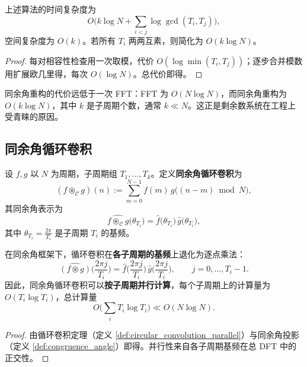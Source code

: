 \begin{theorem}[复杂度]\label{thm:congruence_angle_complexity}
上述算法的时间复杂度为
\[
O\!\Big(k\log N+\sum_{i<j}\log\gcd(T_i,T_j)\Big),
\]
空间复杂度为 $O(k)$。若所有 $T_i$ 两两互素，则简化为 $O(k\log N)$。
\end{theorem}

\begin{proof}
每对相容性检查用一次取模，代价 $O(\log\min(T_i,T_j))$；逐步合并模数用扩展欧几里得，每次 $O(\log N)$。总代价即得。
\end{proof}

\begin{remark}\label{rem:congruence_vs_fft}
同余角重构的代价远低于一次 FFT：FFT 为 $O(N\log N)$，而同余角重构为 $O(k\log N)$，其中 $k$ 是子周期个数，通常 $k\ll N$。这正是剩余数系统在工程上受青睐的原因。
\end{remark}

\subsection{同余角循环卷积}

\begin{definition}[同余角循环卷积]\label{def:congruence_angle_convolution}
设 $f,g$ 以 $N$ 为周期，子周期组 $T_1,\dots,T_k$。定义\textbf{同余角循环卷积}为
\[
(f\circledast_{\mathcal{C}}g)(n):=\sum_{m=0}^{N-1}f(m)\,g\big((n-m)\bmod N\big),
\]
其同余角表示为
\[
\widehat{f\circledast_{\mathcal{C}}g}\big(\theta_{T_i}\big)
=\hat f\big(\theta_{T_i}\big)\,\hat g\big(\theta_{T_i}\big),
\]
其中 $\theta_{T_i}=\frac{2\pi}{T_i}$ 是子周期 $T_i$ 的基频。
\end{definition}

\begin{theorem}[同余角卷积定理]\label{thm:congruence_angle_convolution_theorem}
在同余角框架下，循环卷积在\textbf{各子周期的基频}上退化为逐点乘法：
\[
\widehat{(f\circledast g)}\Big(\frac{2\pi j}{T_i}\Big)
=\hat f\Big(\frac{2\pi j}{T_i}\Big)\,
\hat g\Big(\frac{2\pi j}{T_i}\Big),
\qquad j=0,\dots,T_i-1.
\]
因此，同余角循环卷积可以\textbf{按子周期并行计算}，每个子周期上的计算量为 $O(T_i\log T_i)$，总计算量
\[
O\!\Big(\sum_i T_i\log T_i\Big)\ll O(N\log N).
\]
\end{theorem}

\begin{proof}
由循环卷积定理（定义 \ref{def:circular_convolution_parallel}）与同余角投影（定义 \ref{def:congruence_angle}）即得。并行性来自各子周期基频在总 DFT 中的正交性。
\end{proof}

